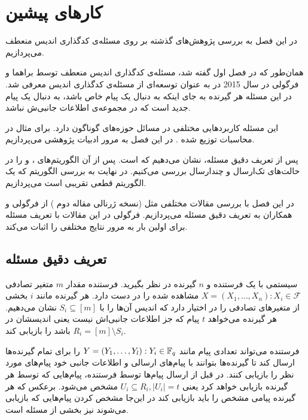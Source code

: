 \chapter{کارهای پیشین}
\label{chapter:literature}

در این فصل به بررسی پژوهش‌های گذشته بر روی مسئله‌ی کدگذاری اندیس منعطف می‌پردازیم.

همان‌طور که در فصل اول گفته شد، مسئله‌ی کدگذاری اندیس منعطف توسط براهما و فرگولی در سال 2015 در
\cite{pliablefirstpaper}
به عنوان توسعه‌ای از مسئله‌ی کدگذاری اندیس معرفی شد. در این مسئله هر گیرنده به جای اینکه به دنبال یک پیام خاص باشد، به دنبال یک پیام جدید است که در مجموعه‌ی اطلاعات جانبی‌ش نباشد.

این مسئله کاربردهایی مختلفی در مسائل حوزه‌های گوناگون دارد. برای مثال در محاسبات توزیع شده
\cite{datashuf}
\cite{8404065}
\cite{8682270}.
در این فصل به مرور ادبیات پژوهشی 
\picod
می‌پردازیم.

پس از تعریف دقیق مسئله، نشان می‌دهیم که 
\picod
\nphard
است. پس از آن الگوریتم‌های
،
و
را در حالت‌های تک‌ارسال و چندارسال بررسی می‌کنیم. در نهایت به بررسی الگوریتم
که یک الگوریتم قطعی تقریبی است می‌پردازیم.

در این فصل با بررسی مقالات مختلفی مثل
\cite{pliablefirstpaper,6620405, pliable2015paper,  song2017polynomialtime}
(نسخه ژرنالی مقاله دوم
\cite{pliable2016}
) از فرگولی و همکاران به تعریف دقیق مسئله می‌پردازیم. فرگولی در این مقالات با تعریف مسئله برای اولین بار به مرور نتایج مختلفی را اثبات می‌کند.
\section{تعریف دقیق مسئله}
\label{sec:3:3}
	سیستمی با یک فرستنده و 
	$n$
	گیرنده در نظر بگیرید. فرستنده مقدار
	$m$
	متغیر تصادفی
	$X = (X_1, \ldots, X_n): X_i \in \mathcal{F}$
	مشاهده شده را در دست دارد. هر گیرنده مانند 
	$i$
	بخشی از متغیرهای تصادفی را در اختیار دارد که اندیس آن‌ها را با 
	$S_i \subseteq [m]$
	نشان می‌دهیم. هر گیرنده می‌خواهد 
	$t$
	پیام که جز اطلاعات جانبی‌اش نیست یعنی اندیسشان در
	$R_i = [m] \setminus S_i$
	باشد را بازیابی کند.
	
	فرستنده می‌تواند تعدادی پیام مانند
	$Y = (Y_1, \ldots, Y_l): Y_i \in {\mathbb{F}_q}$
	را برای تمام گیرنده‌ها ارسال کند تا گیرنده‌ها بتوانند با پیام‌های ارسالی و اطلاعات جانبی خود پیام‌های مورد نظر را بازیابی کنند. در
	\picod
	قبل از ارسال پیام‌ها توسط فرستنده، پیام‌هایی که توسط هر گیرنده بازیابی خواهد کرد یعنی
	$U_i \subseteq R_i,  |U_i| = t$
	 مشخص می‌شود. برعکس 
	\icod
	 که هر گیرنده پیامی مشخص را باید بازیابی کند در این‌جا مشخص کردن پیام‌هایی که بازیابی می‌شوند نیز بخشی از مسئله است.
	 
